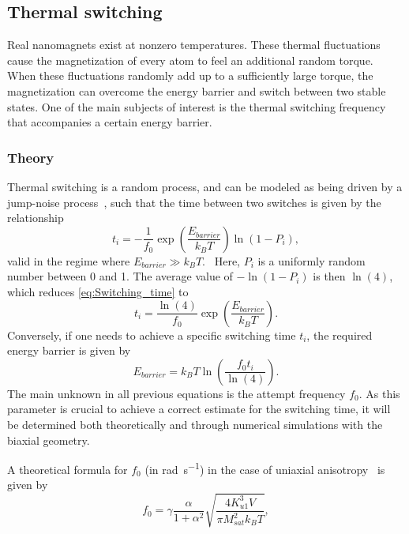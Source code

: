 \documentclass[11pt,a4paper,english]{article}
\begin{document}
\FloatBarrier
\subsection{Thermal switching}
Real nanomagnets exist at nonzero temperatures. These thermal fluctuations cause the magnetization of every atom to feel an additional random torque. When these fluctuations randomly add up to a sufficiently large torque, the magnetization can overcome the energy barrier and switch between two stable states. One of the main subjects of interest is the thermal switching frequency that accompanies a certain energy barrier.

\subsubsection{Theory}
Thermal switching is a random process, and can be modeled as being driven by a jump-noise process~\cite{MagDynamics_JumpNoise}, such that the time between two switches is given by the relationship
\begin{equation}
    t_i = -\frac{1}{f_0} \exp(\frac{E_{barrier}}{k_B T}) \ln(1-P_i) \mathrm{,}
    \label{eq:Switching_time}
\end{equation}
valid in the regime where $E_{barrier} \gg k_B T$.~\cite{RandomSwitch_MonteCarlo} Here, $P_i$ is a uniformly random number between 0 and 1. The average value of $-\ln(1-P_i)$ is then $\ln(4)$, which reduces \cref{eq:Switching_time} to
\begin{equation}
    t_i = \frac{\ln(4)}{f_0} \exp(\frac{E_{barrier}}{k_B T})  \mathrm{.}
    \label{eq:Switching_time_average}
\end{equation}
Conversely, if one needs to achieve a specific switching time $t_i$, the required energy barrier is given by
\begin{equation}
    E_{barrier} = k_B T \ln(\frac{f_0 t_i}{\ln(4)}) \mathrm{.}
\end{equation}
The main unknown in all previous equations is the attempt frequency $f_0$. As this parameter is crucial to achieve a correct estimate for the switching time, it will be determined both theoretically and through numerical simulations with the biaxial geometry. \par
A theoretical formula for $f_0$ (in \si{\radian\per\second}) in the case of uniaxial anisotropy~\cite{MuMax3, LEL-17b, f0_mumax3_reference} is given by
\begin{equation}
    f_0 = \gamma \frac{\alpha}{1+\alpha^2} \sqrt{\frac{4 K_{u1}^3 V}{\pi M_{sat}^2 k_B T}} \mathrm{,}
    \label{eq:f0_theoretical_uniaxial}
\end{equation}
\end{document}
